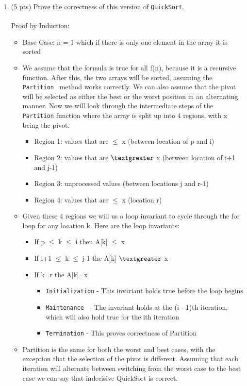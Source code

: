 \documentclass[12pt]{article}
\begin{document}
\begin{enumerate}
\begin{enumerate}
    \item (5 pts) Prove the correctness of this version of {\tt QuickSort}.\\
    \\
    Proof by Induction: \\
    \begin{itemize}
  		\item Base Case: n = 1 which if there is only one element in the array it is sorted
 	 	\item We assume that the formula is true for all f(n), because it is a recursive function. After this, the two arrays will be sorted, 				  assuming the {\tt Partition } method works correctly. We can also assume that the pivot will be selected as either the best or the 			  worst position in an alternating manner. Now we will look through the intermediate steps of the {\tt Partition} function where the 			  array is split up into 4 regions, with x being the pivot.
		\begin{itemize}
			\item Region 1: values that are $\leq$ x (between location of p and i)
			\item Region 2: values that are $\textgreater$ x (between location of i+1 and j-1)
			\item Region 3: unprocessed values (between locations j and r-1)
			\item Region 4: values that are $\leq$ x (location r)
		\end{itemize}
		\item Given these 4 regions we will us a loop invariant to cycle through the for loop for any location k. Here are the loop invariants:
		\begin{itemize}
			\item If p $\leq$ k $\leq$ i then A[k] $\leq$ x
			\item If i+1 $\leq$ k $\leq$ j-1 the A[k] $\textgreater$ x
			\item If k=r the A[k]=x
			\begin{itemize}
				\item {\tt Initialization} - This invariant holds true before the loop begins 
				\item {\tt Maintenance } - The invariant holds at the (i - 1)th iteration, which will also hold true for the ith iteration
				\item {\tt Termination} - This proves correctness of Partition
			\end{itemize}
		\end{itemize}
		\item Partition is the same for both the worst and best cases, with the exception that the selection of the pivot is different. Assuming 			  that each iteration will alternate between switching from the worst case to the best case we can say that indecisive QuickSort is 				  correct.
	\end{itemize}
    

\end{enumerate}
\end{enumerate}
\end{document}
